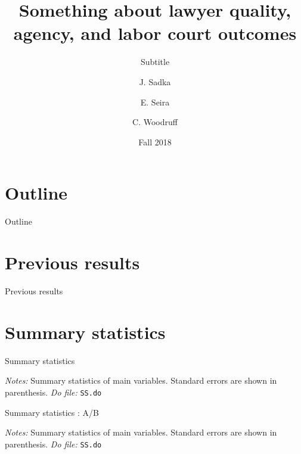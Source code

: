 \documentclass[8pt]{beamer}
\title{Something about lawyer quality, agency, and labor court outcomes }
\subtitle{Subtitle}
\author{J. Sadka\inst{1} \and E. Seira\inst{2} \and C. Woodruff\inst{3}}
\institute[ITAM, Oxford] %
{
  \inst{1,2}%
  ITAM
  \and
  \inst{3}%
  Oxford
}
\date{Fall 2018}
\begin{document}
\begin{frame}
  \titlepage
\end{frame}

\section*{Outline}
\begin{frame}{Outline}
\tableofcontents
\end{frame}

\section{Previous results}
\begin{frame}{Previous results}

\begin{table}[H]
    \caption{Treatment Effects}
    \label{Treatment_effects}
    \begin{center}
    \scriptsize{}
    \end{center}
\end{table}


\end{frame}





\section{Summary statistics}

\begin{frame}{Summary statistics}
    \begin{table}[H]
\caption{SS}
\begin{center}
\tiny{}
\end{center}
 \footnotesize
\textit{Notes:} Summary statistics of main variables. Standard errors are shown in parenthesis.   
\textit{Do file: } \texttt{SS.do}
\end{table}
\end{frame}

\begin{frame}{Summary statistics : A/B}
    \begin{table}[H]
\caption{SS :  A/B}
\begin{center}
\tiny{}
\end{center}
 \footnotesize
\textit{Notes:} Summary statistics of main variables. Standard errors are shown in parenthesis.   
\textit{Do file: } \texttt{SS.do}
\end{table}
\end{frame}
\end{document}
